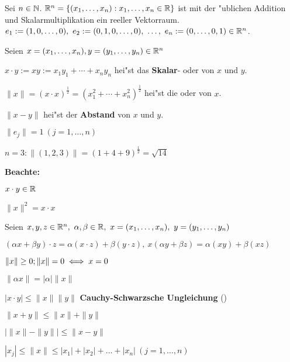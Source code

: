 \documentclass[a4paper,twoside,DIV15,BCOR12mm,chapterprefix=true,headings=twolinechapter]{scrbook}
\begin{document}
Sei $n\in\mathbb{N}$. $\mathbb{R}^n=\{(x_1, \ldots, x_n) : x_1,\ldots, x_n \in \mathbb{R}\}$ ist mit der "ublichen Addition und Skalarmultiplikation ein reeller Vektorraum.\\
$e_1:=(1,0,\ldots,0),\ e_2:=(0,1,0,\ldots, 0),\ \ldots,\ e_n:=(0,\ldots,0,1) \in \mathbb{R}^n$.

\begin{definition}
Seien $x=(x_1, \ldots, x_n), y=(y_1, \ldots, y_n) \in \mathbb{R}^n$
\begin{liste}
\item $x\cdot y := xy := x_1y_1+\cdots+x_ny_n$ hei"st das \textbf{Skalar}- oder  von $x$ und $y$.
\item $\|x\|=(x\cdot x)^\frac{1}{2} = (x_1^2 + \cdots + x_n^2)^\frac{1}{2}$ hei"st die  oder  von $x$.
\item {}$\|x-y\|$ hei"st der \textbf{Abstand} von $x$ und $y$.
\end{liste}
\end{definition}

\begin{beispiele}
\item $\|e_j\|=1\ (j=1,\dots,n)$
\item $n=3: \|(1,2,3)\|=(1+4+9)^{\frac{1}{2}}=\sqrt{14}$
\end{beispiele}

\textbf{Beachte: }
\begin{liste}
\item $x \cdot y \in \mathbb{R}$
\item $\|x\|^2=x \cdot x$
\end{liste}

\begin{satz}
Seien $x,y,z \in \mathbb{R}^n,\ \alpha, \beta \in \mathbb{R},\ x=(x_1, \ldots, x_n),\ y=(y_1, \ldots, y_n)$
\begin{liste}
\item $(\alpha x + \beta y)\cdot z=\alpha(x\cdot z)+\beta(y \cdot z),\ x(\alpha y + \beta z)=\alpha(xy)+\beta(xz)$
\item $\|x\|\ge 0; \|x\|=0\iff x=0$
\item $\|\alpha x\|=|\alpha|\|x\|$
\item $|x \cdot y|\le\|x\| \|y\|$ \textbf{Cauchy-Schwarzsche Ungleichung} ()
\item $\|x+y\|\le\|x\|+\|y\|$
\item ${\left|\|x\|-\|y\|\right|}\le \|x-y\|$
\item $|x_j|\le\|x\|\le |x_1|+|x_2|+\ldots+|x_n|\ (j=1,\ldots,n)$
\end{liste}
\end{satz}
\end{document}
